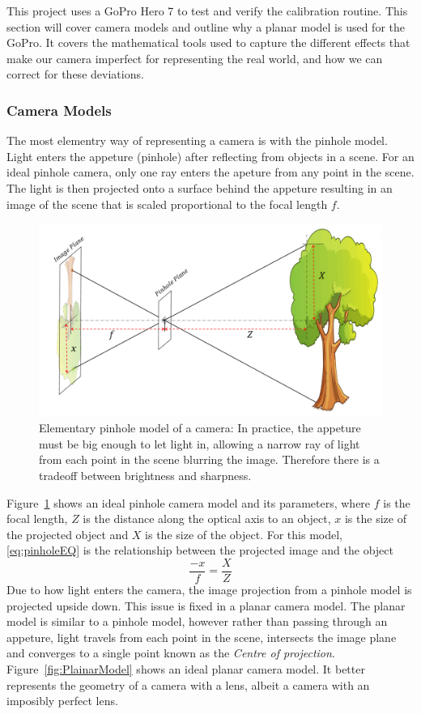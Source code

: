 \documentclass{UoNMCHA}
\numberwithin{equation}{section}
\begin{document}
This project uses a GoPro Hero 7 to test and verify the calibration routine. This section will cover camera models and outline why a planar model is used for the GoPro. It covers the mathematical tools used to capture the different effects that make our camera imperfect for representing the real world, and how we can correct for these deviations.
\subsubsection{Camera Models}
The most elementry way of representing a camera is with the pinhole model. Light enters the appeture (pinhole) after reflecting from objects in a scene. For an ideal pinhole camera, only one ray enters the apeture from any point in the scene. The light is then projected onto a surface behind the appeture resulting in an image of the scene that is scaled proportional to the focal length $f$.

\begin{figure}[ht]
    \begin{center}
        \includegraphics[width=.8\linewidth]{Figures/Pinhole_model}
        \caption{Elementary pinhole model of a camera: In practice, the appeture must be big enough to let light in, allowing a narrow ray of light from each point in the scene blurring the image. Therefore there is a tradeoff between brightness and sharpness.}
        \label{fig:PinholeModel}
    \end{center}
\end{figure}

Figure~\ref{fig:PinholeModel} shows an ideal pinhole camera model and its parameters, where $f$ is the focal length, $Z$ is the distance along the optical axis to an object, $x$ is the size of the projected object and $X$ is the size of the object. For this model, \eqref{eq:pinholeEQ} is the relationship between the projected image and the object
\begin{equation}\label{eq:pinholeEQ}
	\frac{-x}{f} = \frac{X}{Z}
\end{equation}
Due to how light enters the camera, the image projection from a pinhole model is projected upside down. This issue is fixed in a planar camera model. The planar model is similar to a pinhole model, however rather than passing through an appeture, light travels from each point in the scene, intersects the image plane and converges to a single point known as the \textit{Centre of projection}. Figure~\ref{fig:PlainarModel} shows an ideal planar camera model. It better represents the geometry of a camera with a lens, albeit a camera with an imposibly perfect lens.
\end{document}

